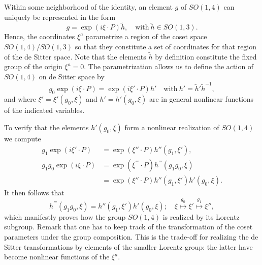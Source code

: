 \documentclass[
final,
11pt,
a4paper,
DIV=11,
headinclude=true,
footinclude=false,
bibliography=totoc,
twoside=true,  %
BCOR=5mm
]{scrbook}
\begin{document}
Within some neighborhood of the identity, an element $g$ of 
$SO(1,4)$ can uniquely be represented in the form
\begin{equation*}
  g = \exp(i\xi\cdot P) \tilde{h},
  \quad\text{with}~\tilde{h} \in SO(1,3).
\end{equation*}
Hence, the coordinates $\xi^a$ parametrize a region of the coset 
space $SO(1,4)/SO(1,3)$ so that they constitute a set of 
coordinates for that region of the de Sitter space. Note that the 
elements $\tilde{h}$ by definition constitute the fixed group of 
the origin $\xi^a = 0$. The parametrization allows us to define 
the action of $SO(1,4)$ on de Sitter space by
\begin{equation}
\label{eq:left_action_group}
  g_0 \exp(i\xi\cdot P) = \exp(i\xi'\cdot P)h'
  \quad\text{with}~%
  h' = \tilde{h}'\tilde{h}^{-1},
\end{equation}
and where $\xi'=\xi'(g_0,\xi)$ and $h'=h'(g_0,\xi)$ are in 
general nonlinear functions of the indicated variables.

To verify that the elements $h'(g_0,\xi)$ form a nonlinear 
realization of $SO(1,4)$ we compute
\begin{align*}
  g_1 \exp(i \xi' \cdot P) &= \exp(\xi'' \cdot P) h''(g_1, \xi'), 
  \\
  g_1 g_0 \exp(i \xi \cdot P) &= \exp(\xi^\third \cdot P) 
  h^\third(g_1 g_0, \xi)
  \\
  &=  \exp(\xi'' \cdot P) h''(g_1, \xi') h'(g_0, \xi).
\end{align*}
It then follows that
\begin{equation*}
  h^\third(g_1 g_0, \xi) = h''(g_1,\xi') h'(g_0, \xi);
  \quad
  \xi \overset{g_0}{\longmapsto} \xi' \overset{g_1}{\longmapsto} 
  \xi'',
\end{equation*}
which manifestly proves how the group $SO(1,4)$ is realized by 
its Lorentz subgroup. Remark that one has to keep track of the 
transformation of the coset parameters under the group 
composition. This is the trade-off for realizing the de Sitter 
transformations by elements of the smaller Lorentz group: the 
latter have become nonlinear functions of the $\xi^a$.
\end{document}
